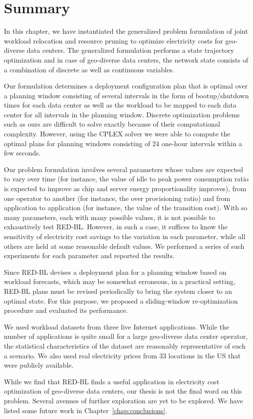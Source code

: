 \section{Summary}
In this chapter, we have instantiated the generalized problem formulation of joint workload relocation and resource pruning to optimize electricity costs for geo-diverse data centers. The generalized formulation performs a state trajectory optimization and in case of geo-diverse data centers, the network state consists of a combination of discrete as well as continuous variables. 

Our formulation determines a deployment configuration plan that is optimal over a planning window consisting of several intervals in the form of bootup/shutdown times for each data center as well as the workload to be mapped to each data center for all intervals in the planning window. Discrete optimization problems such as ours are difficult to solve exactly because of their computational complexity. However, using the CPLEX solver we were able to compute the optimal plans for planning windows consisting of 24 one-hour intervals within a few seconds. 

Our problem formulation involves several parameters whose values are expected to vary over time (for instance, the value of idle to peak power consumption ratio is expected to improve as chip and server energy proportionality improves), from one operator to another (for instance, the over provisioning ratio) and from application to application (for instance, the value of the transition cost). With so many parameters, each with many possible values, it is not possible to exhaustively test RED-BL. However, in such a case, it suffices to know the sensitivity of electricity cost savings to the variation in each parameter, while all others are held at some reasonable default values. We performed a series of such experiments for each parameter and reported the results.

Since RED-BL devises a deployment plan for a planning window based on workload forecasts, which may be somewhat erroneous, in a practical setting, RED-BL plans must be revised periodically to bring the system closer to an optimal state. For this purpose, we proposed a sliding-window re-optimization procedure and evaluated its performance.

We used workload datasets from three live Internet applications. While the number of applications is quite small for a large geo-diverse data center operator, the statistical characteristics of the dataset are reasonably representative of such a scenario. We also used real electricity prices from 33 locations in the US that were publicly available.

While we find that RED-BL finds a useful application in electricity cost optimization of geo-diverse data centers, our thesis is not the final word on this problem. Several avenues of further exploration are yet to be explored. We have listed some future work in Chapter~\ref{chap:conclusions}.